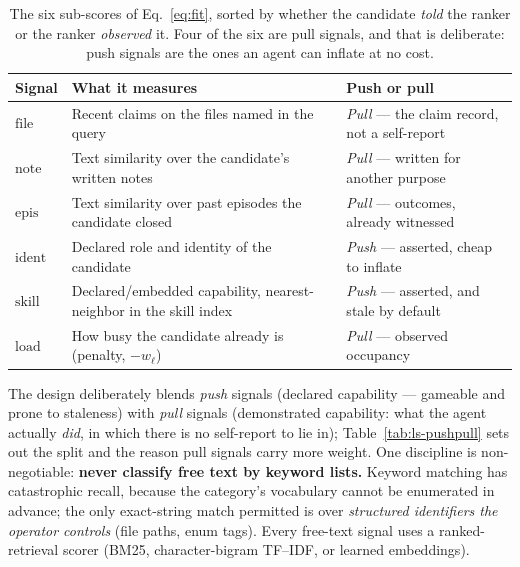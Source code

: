 \documentclass[11pt,a4paper]{article}
\theoremstyle{definition}
\theoremstyle{plain}
\begin{document}
\begin{table}[H]
\centering
\small
\renewcommand{\arraystretch}{1.25}
\begin{tabular}{@{}p{}p{}p{}@{}}
\toprule
\textbf{Signal} & \textbf{What it measures} & \textbf{Push or pull} \\
\midrule
$\mathrm{file}$  & Recent claims on the files named in the query & \emph{Pull} --- the claim record, not a self-report \\
$\mathrm{note}$  & Text similarity over the candidate's written notes & \emph{Pull} --- written for another purpose \\
$\mathrm{epis}$  & Text similarity over past episodes the candidate closed & \emph{Pull} --- outcomes, already witnessed \\
$\mathrm{ident}$ & Declared role and identity of the candidate & \emph{Push} --- asserted, cheap to inflate \\
$\mathrm{skill}$ & Declared/embedded capability, nearest-neighbor in the skill index & \emph{Push} --- asserted, and stale by default \\
$\mathrm{load}$  & How busy the candidate already is (penalty, $-w_\ell$) & \emph{Pull} --- observed occupancy \\
\bottomrule
\end{tabular}
\caption{The six sub-scores of Eq.~\ref{eq:fit}, sorted by whether the candidate
\emph{told} the ranker or the ranker \emph{observed} it. Four of the six are pull
signals, and that is deliberate: push signals are the ones an agent can inflate at no
cost.}
\label{tab:fit-signals}
\end{table}

\noindent The design deliberately blends \emph{push} signals (declared capability
--- gameable and prone to staleness) with \emph{pull} signals (demonstrated
capability: what the agent actually \emph{did}, in which there is no self-report to
lie in); Table~\ref{tab:ls-pushpull} sets out the split and the reason pull signals carry
more weight. One discipline is
non-negotiable: \textbf{never classify free text by keyword lists.} Keyword matching
has catastrophic recall, because the category's vocabulary cannot be enumerated in
advance; the only exact-string match permitted is over \emph{structured identifiers
the operator controls} (file paths, enum tags). Every free-text signal uses a
ranked-retrieval scorer (BM25, character-bigram TF--IDF, or learned embeddings).
\end{document}
